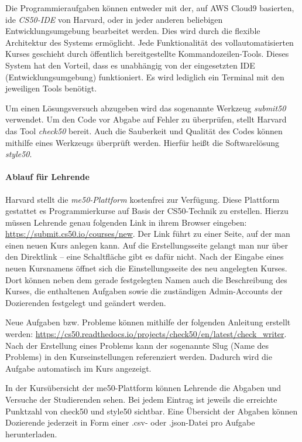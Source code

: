 Die Programmieraufgaben können entweder mit der, auf AWS Cloud9 basierten,
\ac{ide} \emph{CS50-IDE} von Harvard, oder in jeder anderen beliebigen
Entwicklungsumgebung bearbeitet werden. Dies wird durch die flexible Architektur
des Systems ermöglicht. Jede Funktionalität des vollautomatisierten Kurses
geschieht durch öffentlich bereitgestellte Kommandozeilen-Tools. Dieses System
hat den Vorteil, dass es unabhängig von der eingesetzten IDE
(Entwicklungsumgebung) funktioniert. Es wird lediglich ein Terminal mit den
jeweiligen Tools benötigt. \parencite{cs50-ide}

Um einen Lösungsversuch abzugeben wird das sogenannte Werkzeug \emph{submit50}
verwendet. Um den Code vor Abgabe auf Fehler zu überprüfen, stellt Harvard das
Tool \emph{check50} bereit. Auch die Sauberkeit und Qualität des Codes können
mithilfe eines Werkzeugs überprüft werden. Hierfür heißt die Softwarelösung
\emph{style50}. \parencite{submit50}

\paragraph{Ablauf für Lehrende}
Harvard stellt die \emph{me50-Plattform} kostenfrei zur Verfügung. Diese
Plattform gestattet es Programmierkurse auf Basis der CS50-Technik zu
erstellen. Hierzu müssen Lehrende genau folgenden Link in ihrem Browser
eingeben: \url{https://submit.cs50.io/courses/new}. Der Link führt zu einer
Seite, auf der man einen neuen Kurs anlegen kann. Auf die Erstellungsseite
gelangt man nur über den Direktlink -- eine Schaltfläche gibt es dafür nicht.
Nach der Eingabe eines neuen Kursnamens öffnet sich die Einstellungsseite des
neu angelegten Kurses. Dort können neben dem gerade festgelegten Namen auch die
Beschreibung des Kurses, die enthaltenen Aufgaben sowie die zuständigen
Admin-Accounts der Dozierenden festgelegt und geändert werden.

Neue Aufgaben bzw. Probleme können mithilfe der folgenden Anleitung
erstellt werden:
\url{https://cs50.readthedocs.io/projects/check50/en/latest/check_writer}. Nach
der Erstellung eines Problems kann der sogenannte Slug (Name des Problems) in
den Kurseinstellungen referenziert werden. Dadurch wird die Aufgabe automatisch
im Kurs angezeigt.

In der Kursübersicht der me50-Plattform können Lehrende die Abgaben und Versuche
der Studierenden sehen. Bei jedem Eintrag ist jeweils die erreichte Punktzahl
von check50 und style50 sichtbar. Eine Übersicht der Abgaben können Dozierende
jederzeit in Form einer .csv- oder .json-Datei pro Aufgabe herunterladen.


